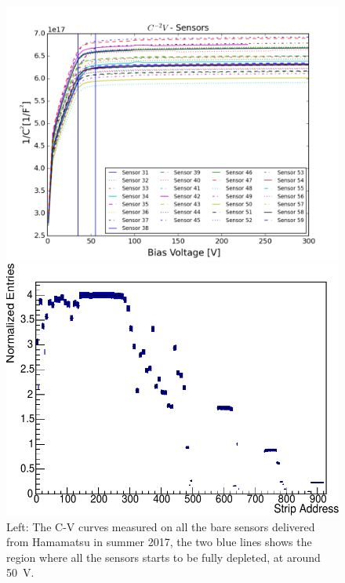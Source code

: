 \begin{figure}[!ht]%
\centering
\begin{minipage}{.5\textwidth}
  \centering
  \includegraphics[width=1.05\linewidth]{pics/CV.png}
\end{minipage}%
\begin{minipage}{.5\textwidth}
  \includegraphics[width=\linewidth]{pics/S58_K2_2018_05_07_16_49_42_strip_entries_modded}
\end{minipage}%
\caption{
Left: The C-V curves measured on all the bare sensors delivered from Hamamatsu in summer 2017, the two blue lines shows the region where all the sensors starts to be fully depleted, at around \SI{50}{\volt}.
}
\end{figure}
